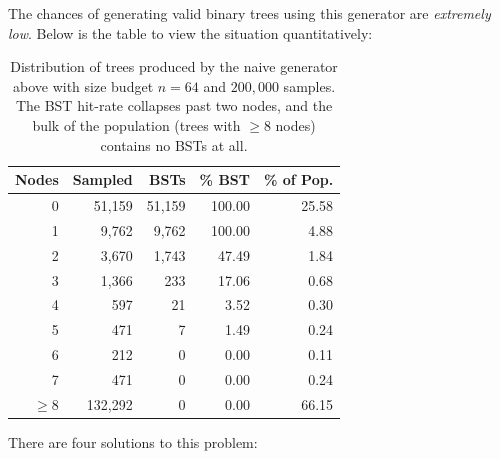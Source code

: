 \noindent The chances of generating valid binary trees using this generator are \emph{extremely
  low}. Below is the table to view the situation quantitatively:

\begin{table}[h!]
  \centering
  \caption{Distribution of trees produced by the naive generator above with size
    budget $n=64$ and $200{,}000$ samples. The BST hit-rate collapses past two nodes,
    and the bulk of the population (trees with $\geq 8$ nodes) contains no BSTs at
    all.}
  \label{tab:naive-bst-rate}
  \begin{tabular}{|r|r|r|r|r|}
    \hline
    Nodes    & Sampled   & BSTs     & \% BST & \% of Pop. \\
    \hline
    0        & 51{,}159  & 51{,}159 & 100.00 & 25.58      \\
    1        & 9{,}762   & 9{,}762  & 100.00 & 4.88       \\
    2        & 3{,}670   & 1{,}743  & 47.49  & 1.84       \\
    3        & 1{,}366   & 233      & 17.06  & 0.68       \\
    4        & 597       & 21       & 3.52   & 0.30       \\
    5        & 471       & 7        & 1.49   & 0.24       \\
    6        & 212       & 0        & 0.00   & 0.11       \\
    7        & 471       & 0        & 0.00   & 0.24       \\
    \hline
    $\geq 8$ & 132{,}292 & 0        & 0.00   & 66.15      \\
    \hline
  \end{tabular}
\end{table}

\noindent There are four solutions to this problem:

